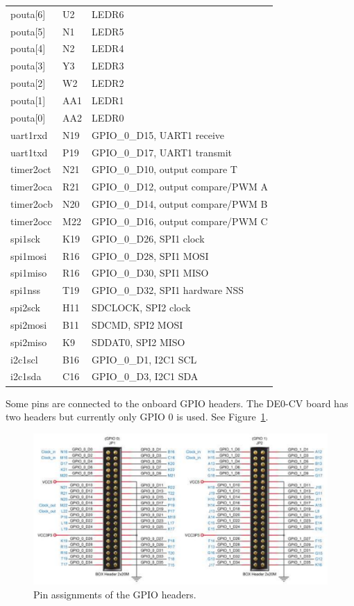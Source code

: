 \documentclass[12pt]{article}
\begin{document}
\begin{longtable}{lll}
pouta[6]  & U2       & LEDR6 \\
pouta[5]  & N1       & LEDR5 \\
pouta[4]  & N2       & LEDR4 \\
pouta[3]  & Y3       & LEDR3 \\
pouta[2]  & W2       & LEDR2 \\
pouta[1]  & AA1      & LEDR1 \\
pouta[0]  & AA2      & LEDR0 \\
uart1rxd  & N19      & GPIO\_0\_D15, UART1 receive \\
uart1txd  & P19      & GPIO\_0\_D17, UART1 transmit  \\
timer2oct & N21      & GPIO\_0\_D10, output compare T \\
timer2oca & R21      & GPIO\_0\_D12, output compare/PWM A \\
timer2ocb & N20      & GPIO\_0\_D14, output compare/PWM B \\
timer2occ & M22      & GPIO\_0\_D16, output compare/PWM C \\
spi1sck   & K19      & GPIO\_0\_D26, SPI1 clock \\
spi1mosi  & R16      & GPIO\_0\_D28, SPI1 MOSI \\
spi1miso  & R16      & GPIO\_0\_D30, SPI1 MISO \\
spi1nss   & T19      & GPIO\_0\_D32, SPI1 hardware NSS \\
spi2sck   & H11      & SDCLOCK, SPI2 clock \\
spi2mosi  & B11      & SDCMD, SPI2 MOSI \\
spi2miso  & K9       & SDDAT0, SPI2 MISO \\
i2c1scl   & B16      & GPIO\_0\_D1, I2C1 SCL \\
i2c1sda   & C16      & GPIO\_0\_D3, I2C1 SDA
\end{longtable}

Some pins are connected to the onboard GPIO headers. The DE0-CV board has two headers but currently only GPIO 0 is used. See Figure~\ref{fig:de0-cv-gpio}.

\begin{figure}[!ht]
\centering
\includegraphics[scale=0.63]{de0-cv-gpio}
\caption{Pin assignments of the GPIO headers.}
\label{fig:de0-cv-gpio}
\end{figure}
\end{document}
